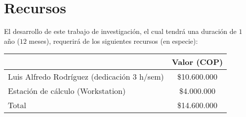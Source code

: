 \newpage
\section{Recursos}
El desarrollo de este trabajo de investigación, el cual tendrá una duración de $1$ año ($12$ meses), requerirá de los siguientes recursos (en especie):

\begin{table}[!hpt]
    \centering
    \begin{tabular}{|l|c|}
        \hline
        & Valor (COP) \\ \hline
        Luis Alfredo Rodríguez (dedicación 3 h/sem) & \$10.600.000\\ \hline
        Estación de cálculo (Workstation) & \$4.000.000 \\ \hline
        Total & \$14.600.000 \\ \hline
    \end{tabular}
\end{table}